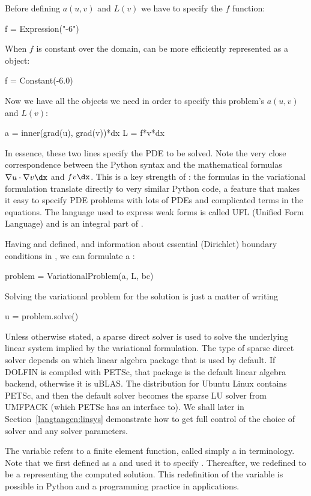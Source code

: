 Before defining $a(u,v)$ and $L(v)$ we have to specify the $f$ function:
\begin{python}
f = Expression("-6")
\end{python}
When $f$ is constant over the domain,  can be
more efficiently represented as a  object:
\begin{python}
f = Constant(-6.0)
\end{python}
Now we have all the objects we need in order to specify this problem's
$a(u,v)$ and $L(v)$:
\begin{python}
a = inner(grad(u), grad(v))*dx
L = f*v*dx
\end{python}
In essence, these two lines specify the PDE to be solved.
Note the very close correspondence between the Python syntax
and the mathematical formulas $\nabla u\cdot\nabla v\dx$ and
$fv\dx$.
This is a key strength of \fenics: the formulas in the variational
formulation translate directly to very similar Python code, a feature
that makes it easy to specify PDE problems with lots of PDEs and
complicated terms in the equations.
The language used to express weak forms is called UFL (Unified Form Language)
and is an integral part of \fenics.

Having  and  defined, and information about essential
(Dirichlet) boundary conditions in , we can formulate a
:
\begin{python}
problem = VariationalProblem(a, L, bc)
\end{python}
Solving the variational problem for the solution  is just a
matter of writing
\begin{python}
u = problem.solve()
\end{python}
Unless otherwise stated, a sparse direct solver is used to solve the underlying
linear system implied by the variational formulation. The type
of sparse direct solver depends on which linear algebra package
that is used by default. If DOLFIN is compiled with PETSc, that package
is the default linear algebra backend, otherwise it is uBLAS.
The \fenics{} distribution for Ubuntu Linux contains PETSc, and then
the default solver becomes the sparse LU solver from UMFPACK (which
PETSc has an interface to). We shall later in Section~\ref{langtangen:linsys}
demonstrate how to get
full control of the choice of solver and any solver parameters.

The  variable refers to a finite element function, called simply
a  in \fenics{} terminology.
Note that we first defined  as
a  and used it to specify .
Thereafter, we redefined  to be a  representing
the computed solution. This redefinition of the variable 
is possible in Python and a programming practice in \fenics{}
applications.

